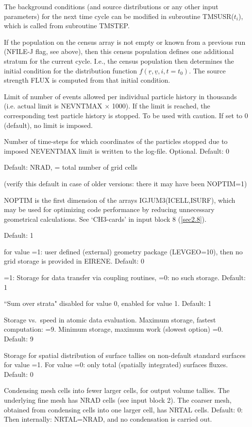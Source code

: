 \begin{description}
        The background conditions (and source distributions or any other input
        parameters) for the next time cycle can be modified in subroutine
        TMSUSR($t_i$), which is called from subroutine TMSTEP.

        If the population on the census array is not empty or known from a previous run
        (NFILE-J flag, see above), then this census population defines one additional
        stratum for the current cycle.
        I.e., the census population then determines the initial condition for the
        distribution function $f(\underline{r},\underline{v}, i, t = t_0)$.
        The source strength FLUX is computed from that initial condition.
  \item[NEVNTMAX] Limit of number of events allowed per individual particle history in thousands
	(i.e. actual limit is NEVNTMAX $\times$ 1000).
	If the limit is reached, the corresponding test particle history is stopped. To be
	used with caution. If set to 0 (default), no limit is imposed.
  \item[NVNMXTR] Number of time-steps for which coordinates of the particles stopped
	due to imposed NEVENTMAX limit is written to the log-file. Optional. Default: 0
  \item[NOPTIM] Default: NRAD, = total number of grid cells

        (verify this default in case of older versions: there it may have been
        NOPTIM=1)

        NOPTIM is the first dimension of the arrays IGJUM3(ICELL,ISURF), which may be
        used for optimizing code performance by reducing unnecessary geometrical
        calculations.
        See `CH3-cards' in input block 8 (\cref{sec2.8}).
  \item[NOPTM1] Default: 1
  \item[NGEOM\_USR] for value =1: user defined
        (external) geometry package (LEVGEO=10), then no grid storage is provided in
        EIRENE.
        Default: 0
  \item[NCOUP\_INPUT] =1: Storage for data transfer via coupling
        routines, =0:
        no such storage.
        Default: 1
  \item[NSMSTRA] ``Sum over strata" disabled for value 0, enabled for
        value 1.
        Default: 1
  \item[NSTORAM] Storage vs.\ speed in atomic data evaluation.
        Maximum storage, fastest computation: =9.
        Minimum storage, maximum work (slowest option) =0.
        Default: 9
  \item[NGSTAL] Storage for spatial distribution of surface tallies on
        non-default standard surfaces for value =1.
        For value =0: only total (spatially integrated) surfaces fluxes.
        Default: 0
  \item[NRTAL] Condensing mesh cells into fewer larger cells, for
        output volume tallies.
        The underlying fine mesh has NRAD cells (see input block 2).
        The coarser mesh, obtained from condensing cells into one larger cell, has
        NRTAL cells.
        Default: 0: Then internally: NRTAL=NRAD, and no condensation is carried out.


\end{description}
